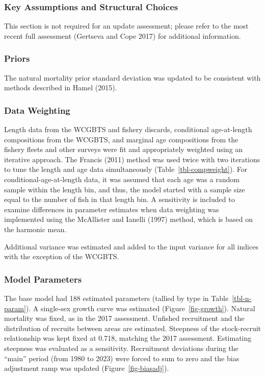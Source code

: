 \documentclass[
]{scrartcl}
\begin{document}
\subsubsection{Key Assumptions and Structural
Choices}\label{key-assumptions-and-structural-choices}

This section is not required for an update assessment; please refer to
the most recent full assessment (Gertseva and Cope 2017) for additional
information.

\subsubsection{Priors}\label{priors}

The natural mortality prior standard deviation was updated to be
consistent with methods described in Hamel (2015).

\subsubsection{Data Weighting}\label{data-weighting}

Length data from the WCGBTS and fishery discards, conditional
age-at-length compositions from the WCGBTS, and marginal age
compositions from the fishery fleets and other surveys were fit and
appropriately weighted using an iterative approach. The Francis (2011)
method was used twice with two iterations to tune the length and age
data simultaneously (Table~\ref{tbl-compweight}). For
conditional-age-at-length data, it was assumed that each age was a
random sample within the length bin, and thus, the model started with a
sample size equal to the number of fish in that length bin. A
sensitivity is included to examine differences in parameter estimates
when data weighting was implemented using the McAllister and Ianelli
(1997) method, which is based on the harmonic mean.

Additional variance was estimated and added to the input variance for
all indices with the exception of the WCGBTS.

\subsubsection{Model Parameters}\label{model-parameters}

The base model had 188 estimated parameters (tallied by type in
Table~\ref{tbl-n-param}). A single-sex growth curve was estimated
(Figure~\ref{fig-growth}). Natural mortality was fixed, as in the 2017
assessment. Unfished recruitment and the distribution of recruits
between areas are estimated. Steepness of the stock-recruit relationship
was kept fixed at 0.718, matching the 2017 assessment. Estimating
steepness was evaluated as a sensitivity. Recruitment deviations during
the ``main'' period (from 1980 to 2023) were forced to sum to zero and
the bias adjustment ramp was updated (Figure~\ref{fig-biasadj}).
\end{document}
